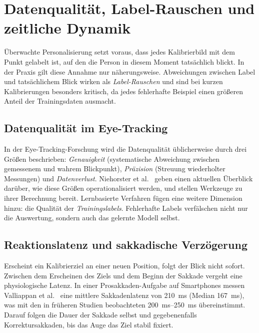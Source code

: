 \documentclass[
  11pt,
  a4paper,
  oneside,
  DIV=12,                 %
  BCOR=8mm,               %
  parskip=half,           %
  headings=normal,
  bibliography=totoc,     %
  listof=totoc            %
]{scrreprt}
\begin{document}
\section{Datenqualität, Label-Rauschen und zeitliche Dynamik}
\label{sec:label_noise}
Überwachte Personalisierung setzt voraus, dass jedes Kalibrierbild mit dem Punkt gelabelt ist, auf den die Person in diesem Moment tatsächlich blickt. In der Praxis gilt diese Annahme nur näherungsweise. Abweichungen zwischen Label und tatsächlichem Blick wirken als \emph{Label-Rauschen} und sind bei kurzen Kalibrierungen besonders kritisch, da jedes fehlerhafte Beispiel einen größeren Anteil der Trainingsdaten ausmacht.

\subsection{Datenqualität im Eye-Tracking}
\label{subsec:datenqualitaet}
In der Eye-Tracking-Forschung wird die Datenqualität üblicherweise durch drei Größen beschrieben: \emph{Genauigkeit} (systematische Abweichung zwischen gemessenem und wahrem Blickpunkt), \emph{Präzision} (Streuung wiederholter Messungen) und \emph{Datenverlust}. Niehorster et al.~\cite{niehorster2026quality} geben einen aktuellen Überblick darüber, wie diese Größen operationalisiert werden, und stellen Werkzeuge zu ihrer Berechnung bereit. Lernbasierte Verfahren fügen eine weitere Dimension hinzu: die Qualität der \emph{Trainingslabels}. Fehlerhafte Labels verfälschen nicht nur die Auswertung, sondern auch das gelernte Modell selbst.

\subsection{Reaktionslatenz und sakkadische Verzögerung}
\label{subsec:latenz}
Erscheint ein Kalibrierziel an einer neuen Position, folgt der Blick nicht sofort. Zwischen dem Erscheinen des Ziels und dem Beginn der Sakkade vergeht eine physiologische Latenz. In einer Prosakkaden-Aufgabe auf Smartphones messen Valliappan et al.~\cite{valliappan2020smartphone} eine mittlere Sakkadenlatenz von \SI{210}{\milli\second} (Median \SI{167}{\milli\second}), was mit den in früheren Studien beobachteten \SIrange{200}{250}{\milli\second} übereinstimmt. Darauf folgen die Dauer der Sakkade selbst und gegebenenfalls Korrektursakkaden, bis das Auge das Ziel stabil fixiert.
\end{document}
